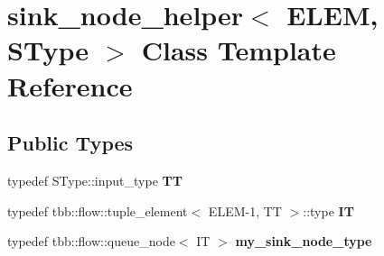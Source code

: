 \hypertarget{classsink__node__helper}{}\section{sink\+\_\+node\+\_\+helper$<$ E\+L\+E\+M, S\+Type $>$ Class Template Reference}
\label{classsink__node__helper}
\subsection*{Public Types}
\begin{DoxyCompactItemize}
\item 
\hypertarget{classsink__node__helper_aa0f653731253b414e29d9436409e73fd}{}typedef S\+Type\+::input\+\_\+type {\bfseries T\+T}\label{classsink__node__helper_aa0f653731253b414e29d9436409e73fd}

\item 
\hypertarget{classsink__node__helper_aa1995c504422d5a9e128bc57f53b7fe5}{}typedef tbb\+::flow\+::tuple\+\_\+element$<$ E\+L\+E\+M-\/1, T\+T $>$\+::type {\bfseries I\+T}\label{classsink__node__helper_aa1995c504422d5a9e128bc57f53b7fe5}

\item 
\hypertarget{classsink__node__helper_af4f61ddd8b635b0587c1351cf2f33b11}{}typedef tbb\+::flow\+::queue\+\_\+node$<$ I\+T $>$ {\bfseries my\+\_\+sink\+\_\+node\+\_\+type}\label{classsink__node__helper_af4f61ddd8b635b0587c1351cf2f33b11}

\end{DoxyCompactItemize}
